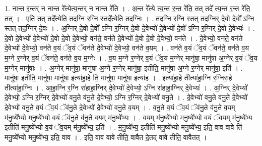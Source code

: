 \documentclass[17pt]{extarticle}
\begin{document}
1. नान्त र॒न्तर् न नान्त रे᳚त्येत्य॒न्तर् न नान्त रे॑ति । . अ॒न्त रे᳚त्ये त्य॒न्त र॒न्त रे॑ति॒ तत् तदे᳚ त्य॒न्त र॒न्त रे॑ति॒ तत् । . ए॒ति॒ तत् तदे᳚त्येति॒ तद॒ग्नि र॒ग्नि स्तदे᳚त्येति॒ तद॒ग्निः । . तद॒ग्नि र॒ग्नि स्तत् तद॒ग्निर् दे॒वो दे॒वो᳚ ऽग्नि स्तत् तद॒ग्निर् दे॒वः । . अ॒ग्निर् दे॒वो दे॒वो᳚ ऽग्नि र॒ग्निर् दे॒वो दे॒वेभ्यो॑ दे॒वेभ्यो॑ दे॒वो᳚ ऽग्नि र॒ग्निर् दे॒वो दे॒वेभ्यः॑ । . दे॒वो दे॒वेभ्यो॑ दे॒वेभ्यो॑ दे॒वो दे॒वो दे॒वेभ्यो॒ वन॑ते॒ वन॑ते दे॒वेभ्यो॑ दे॒वो दे॒वो दे॒वेभ्यो॒ वन॑ते । . दे॒वेभ्यो॒ वन॑ते॒ वन॑ते दे॒वेभ्यो॑ दे॒वेभ्यो॒ वन॑ते व॒यं ॅव॒यं ॅवन॑ते दे॒वेभ्यो॑ दे॒वेभ्यो॒ वन॑ते व॒यम् । . वन॑ते व॒यं ॅव॒यं ॅवन॑ते॒ वन॑ते व॒य म॒ग्ने र॒ग्नेर् व॒यं ॅवन॑ते॒ वन॑ते व॒य म॒ग्नेः । . व॒य म॒ग्ने र॒ग्नेर् व॒यं ॅव॒य म॒ग्नेर् मानु॑षा॒ मानु॑षा अ॒ग्नेर् व॒यं ॅव॒य म॒ग्नेर् मानु॑षाः । . अ॒ग्नेर् मानु॑षा॒ मानु॑षा अ॒ग्ने र॒ग्नेर् मानु॑षा॒ इतीति॒ मानु॑षा अ॒ग्ने र॒ग्नेर् मानु॑षा॒ इति॑ । . मानु॑षा॒ इतीति॒ मानु॑षा॒ मानु॑षा॒ इत्या॑हा॒हे ति॒ मानु॑षा॒ मानु॑षा॒ इत्या॑ह । . इत्या॑हा॒हे तीत्या॑हा॒ग्नि र॒ग्निरा॒हे तीत्या॑हा॒ग्निः । . आ॒हा॒ग्नि र॒ग्नि रा॑हाहा॒ग्निर् दे॒वेभ्यो॑ दे॒वेभ्यो॒ ऽग्नि रा॑हाहा॒ग्निर् दे॒वेभ्यः॑ । . अ॒ग्निर् दे॒वेभ्यो॑ दे॒वेभ्यो॒ ऽग्नि र॒ग्निर् दे॒वेभ्यो॑ वनु॒ते व॑नु॒ते दे॒वेभ्यो॒ ऽग्नि र॒ग्निर् दे॒वेभ्यो॑ वनु॒ते । . दे॒वेभ्यो॑ वनु॒ते व॑नु॒ते दे॒वेभ्यो॑ दे॒वेभ्यो॑ वनु॒ते व॒यं ॅव॒यं ॅव॑नु॒ते दे॒वेभ्यो॑ दे॒वेभ्यो॑ वनु॒ते व॒यम् । . व॒नु॒ते व॒यं ॅव॒यं ॅव॑नु॒ते व॑नु॒ते व॒यम् म॑नु॒ष्ये᳚भ्यो मनु॒ष्ये᳚भ्यो व॒यं ॅव॑नु॒ते व॑नु॒ते व॒यम् म॑नु॒ष्ये᳚भ्यः । . व॒यम् म॑नु॒ष्ये᳚भ्यो मनु॒ष्ये᳚भ्यो व॒यं ॅव॒यम् म॑नु॒ष्ये᳚भ्य॒ इतीति॑ मनु॒ष्ये᳚भ्यो व॒यं ॅव॒यम् म॑नु॒ष्ये᳚भ्य॒ इति॑ । . म॒नु॒ष्ये᳚भ्य॒ इतीति॑ मनु॒ष्ये᳚भ्यो मनु॒ष्ये᳚भ्य॒ इति॒ वाव वावे ति॑ मनु॒ष्ये᳚भ्यो मनु॒ष्ये᳚भ्य॒ इति॒ वाव । . इति॒ वाव वावे तीति॒ वावैत दे॒तद् वावे तीति॒ वावैतत् । \newline
\end{document}
